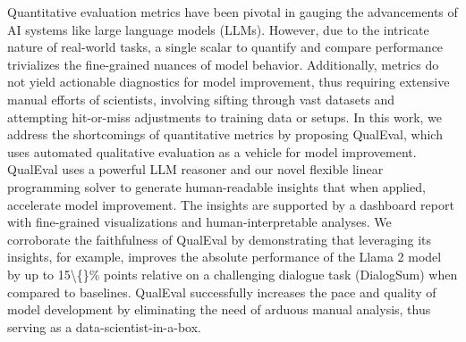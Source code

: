 Quantitative evaluation metrics have been pivotal in gauging the advancements of AI systems like large language models (LLMs). However, due to the intricate nature of real-world tasks, a single scalar to quantify and compare performance trivializes the fine-grained nuances of model behavior. Additionally, metrics do not yield actionable diagnostics for model improvement, thus requiring extensive manual efforts of scientists, involving sifting through vast datasets and attempting hit-or-miss adjustments to training data or setups. In this work, we address the shortcomings of quantitative metrics by proposing QualEval, which uses automated qualitative evaluation as a vehicle for model improvement. QualEval uses a powerful LLM reasoner and our novel flexible linear programming solver to generate human-readable insights that when applied, accelerate model improvement. The insights are supported by a dashboard report with fine-grained visualizations and human-interpretable analyses. We corroborate the faithfulness of QualEval by demonstrating that leveraging its insights, for example, improves the absolute performance of the Llama 2 model by up to 15\textbackslash\{\}\% points relative on a challenging dialogue task (DialogSum) when compared to baselines. QualEval successfully increases the pace and quality of model development by eliminating the need of arduous manual analysis, thus serving as a data-scientist-in-a-box.